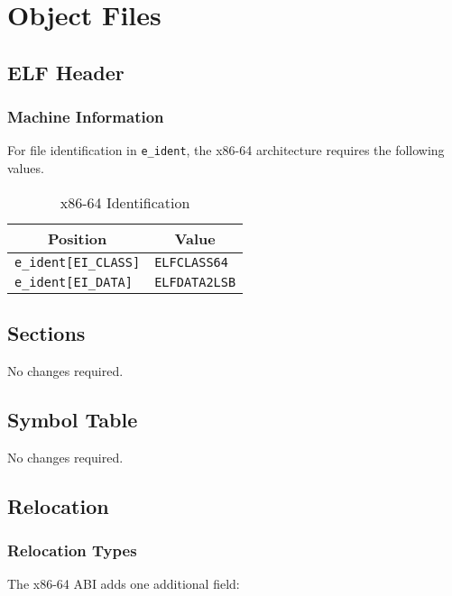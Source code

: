 
\chapter{Object Files}

\section{ELF Header}

\subsection{Machine Information}

For file identification in \texttt{e_ident}, the x86-64 architecture
requires the following values.

\begin{table}[h]
  \begin{center}
    \begin{tabular}[t]{l|l}
      \multicolumn{1}{c}{Position} & \multicolumn{1}{c}{Value} \\
      \hline
      \texttt{e_ident[EI_CLASS]} & \texttt{ELFCLASS64} \\
      \texttt{e_ident[EI_DATA]} & \texttt{ELFDATA2LSB}
    \end{tabular}
  \end{center}
  \caption{x86-64 Identification}
\end{table}

\section{Sections}

No changes required.

\section{Symbol Table}

No changes required.

\section{Relocation}

\subsection{Relocation Types}

The x86-64 ABI adds one additional field:

